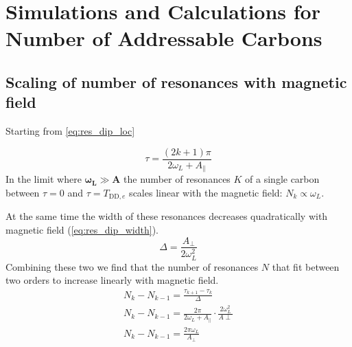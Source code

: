 \chapter{Simulations and Calculations for Number of Addressable Carbons}
\label{chap:addressable_carbon_sims}

\section{Scaling of number of resonances with magnetic field}
Starting from \cref{eq:res_dip_loc}

\begin{equation}
    \tau = \frac{(2k+1)\pi}{2\omega_L+A_\parallel}
\end{equation}
In the limit where $\bm{\omega_L} \gg \bm{A}$ the number of resonances $K$ of a single carbon between $\tau = 0$ and $\tau = T_{\mathrm{DD},e}$ scales linear with the magnetic field: $N_k \propto \omega_L$.

At the same time the width of these resonances decreases quadratically with magnetic field (\cref{eq:res_dip_width}).
\begin{equation}
    \Delta = \frac{A_\perp }{2\omega_L^2}
\end{equation}
Combining these two we find that the number of resonances $N$ that fit between two orders to increase linearly with magnetic field.
\begin{eqnarray}
N_k -N_{k-1} = \frac{\tau_{k+1} -\tau_k} {\Delta} \\
N_k -N_{k-1} = \frac{2\pi}{2\omega_L +A_\parallel} \cdot \frac{2\omega_L ^2}{A\perp}\\
N_k -N_{k-1} = \frac{2\pi \omega_L}{A_\perp }
\end{eqnarray}



